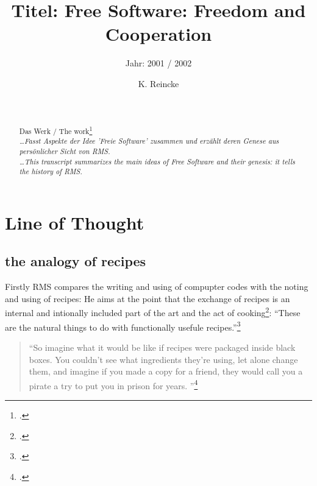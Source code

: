 \documentclass[DIV=calc,BCOR=5mm,11pt,headings=small,oneside,abstract=true, toc=bib]{scrartcl}
\begin{document}

\titlehead{Literaturexzerpt}
\subject{Autor(en): Stallman / Stallman2001a}
\title{Titel: Free Software: Freedom and Cooperation}
\subtitle{Jahr: 2001 / 2002 }
\author{K. Reincke}

\maketitle

\begin{abstract}
\noindent
\cite[(in:)][]{StaGay2002a} \\
\noindent
\cite[(ist:)][]{Stallman2001a} \\
Das Werk / The work\footcite[][]{Stallman2001a} \\
\noindent \itshape
\ldots  Fasst Aspekte der Idee 'Freie Software' zusammen und erzählt deren
Genese aus persönlicher Sicht von RMS.
\\
\noindent
\ldots This transcript summarizes the main ideas of Free Software and their
genesis: it tells the history of RMS.
\end{abstract}
\footnotesize
\normalsize

\section{Line of Thought}

\subsection{the analogy of recipes}
Firstly RMS compares the writing and using of compupter codes with the noting
and using of recipes: He aims at the point that the exchange of recipes is an
internal and intionally included part of the art and the act of
cooking\footcite[cf][156]{Stallman2001a}: \enquote{These are the natural things to
do with functionally usefule recipes.}\footcite[][156]{Stallman2001a}

\begin{quote}
\enquote{So imagine what it would be like if recipes were packaged inside black
boxes. You couldn't see what ingredients they're using, let alone change them,
and imagine if you made a copy for a friend, they would call you a pirate a try
to put you in prison for years.
}\footcite[][157]{Stallman2001a}
\end{quote}
\end{document}
